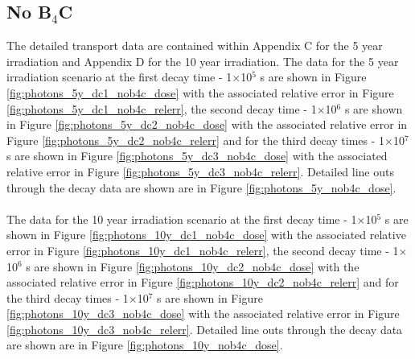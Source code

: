 \documentclass[12pt]{article}
\begin{document}
\subsection{No B$_4$C}
\label{sec:sdr_results_nob4c}
The detailed transport data are contained within Appendix C for the 5 year irradiation
and Appendix D for the 10 year irradiation. The data for the 5 year irradiation scenario
at the first decay time - 1$\times$10$^5$ s are shown in Figure \ref{fig:photons_5y_dc1_nob4c_dose} with the
associated relative error in Figure \ref{fig:photons_5y_dc1_nob4c_relerr}, the second
decay time - 1$\times$10$^6$ s are shown in Figure \ref{fig:photons_5y_dc2_nob4c_dose} with the
associated relative error in Figure \ref{fig:photons_5y_dc2_nob4c_relerr} and for the
third decay times - 1$\times$10$^7$ s are shown in Figure \ref{fig:photons_5y_dc3_nob4c_dose} with the
associated relative error in Figure \ref{fig:photons_5y_dc3_nob4c_relerr}. Detailed line outs
through the decay data are shown are in Figure \ref{fig:photons_5y_nob4c_dose}.
\\
\\
The data for the 10 year irradiation scenario
at the first decay time - 1$\times$10$^5$ s are shown in Figure \ref{fig:photons_10y_dc1_nob4c_dose} with the
associated relative error in Figure \ref{fig:photons_10y_dc1_nob4c_relerr}, the second
decay time - 1$\times$10$^6$ s are shown in Figure \ref{fig:photons_10y_dc2_nob4c_dose} with the
associated relative error in Figure \ref{fig:photons_10y_dc2_nob4c_relerr} and for the
third decay times - 1$\times$10$^7$ s are shown in Figure \ref{fig:photons_10y_dc3_nob4c_dose} with the
associated relative error in Figure \ref{fig:photons_10y_dc3_nob4c_relerr}. Detailed line outs
through the decay data are shown are in Figure \ref{fig:photons_10y_nob4c_dose}.
\newpage
\end{document}

